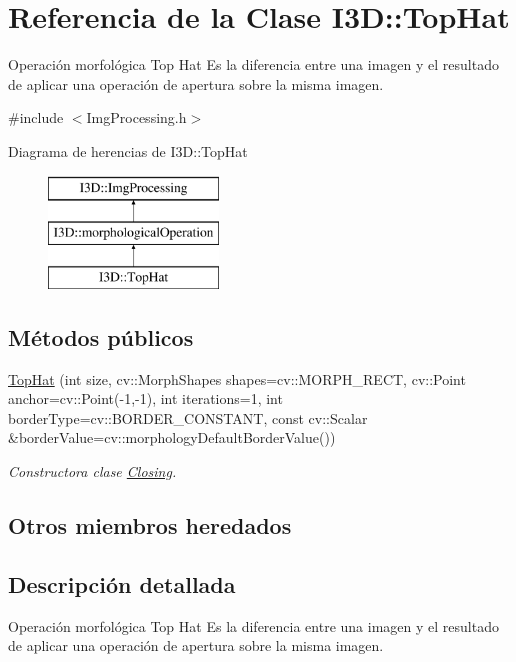 \hypertarget{class_i3_d_1_1_top_hat}{}\section{Referencia de la Clase I3D\+:\+:Top\+Hat}
\label{class_i3_d_1_1_top_hat}


Operación morfológica Top Hat Es la diferencia entre una imagen y el resultado de aplicar una operación de apertura sobre la misma imagen.  




{\ttfamily \#include $<$Img\+Processing.\+h$>$}

Diagrama de herencias de I3D\+:\+:Top\+Hat\begin{figure}[H]
\begin{center}
\leavevmode
\includegraphics[height=3.000000cm]{class_i3_d_1_1_top_hat}
\end{center}
\end{figure}
\subsection*{Métodos públicos}
\begin{DoxyCompactItemize}
\item 
\hyperlink{class_i3_d_1_1_top_hat_a36e924a9ed4ea5ea850145c651b87671}{Top\+Hat} (int size, cv\+::\+Morph\+Shapes shapes=cv\+::\+M\+O\+R\+P\+H\+\_\+\+R\+E\+CT, cv\+::\+Point anchor=cv\+::\+Point(-\/1,-\/1), int iterations=1, int border\+Type=cv\+::\+B\+O\+R\+D\+E\+R\+\_\+\+C\+O\+N\+S\+T\+A\+NT, const cv\+::\+Scalar \&border\+Value=cv\+::morphology\+Default\+Border\+Value())
\begin{DoxyCompactList}\small\item\em Constructora clase \hyperlink{class_i3_d_1_1_closing}{Closing}. \end{DoxyCompactList}\end{DoxyCompactItemize}
\subsection*{Otros miembros heredados}


\subsection{Descripción detallada}
Operación morfológica Top Hat Es la diferencia entre una imagen y el resultado de aplicar una operación de apertura sobre la misma imagen. 

